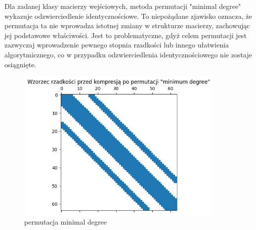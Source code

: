 \documentclass{article}
\begin{document}
\FloatBarrier
Dla zadanej klasy macierzy wejściowych, metoda permutacji "minimal degree" wykazuje odzwierciedlenie identycznościowe. To niepożądane zjawisko oznacza, że permutacja ta nie wprowadza istotnej zmiany w strukturze macierzy, zachowując jej podstawowe właściwości. Jest to problematyczne, gdyż celem permutacji jest zazwyczaj wprowadzenie pewnego stopnia rzadkości lub innego ułatwienia algorytmicznego, co w przypadku odzwierciedlenia identycznościowego nie zostaje osiągnięte.
\begin{figure}[htbp]
  \centering
  \includegraphics[width=0.9\textwidth]{img/2c1k2.png}
  \caption{permutacja minimal degree}
\end{figure}
\FloatBarrier
\end{document}
